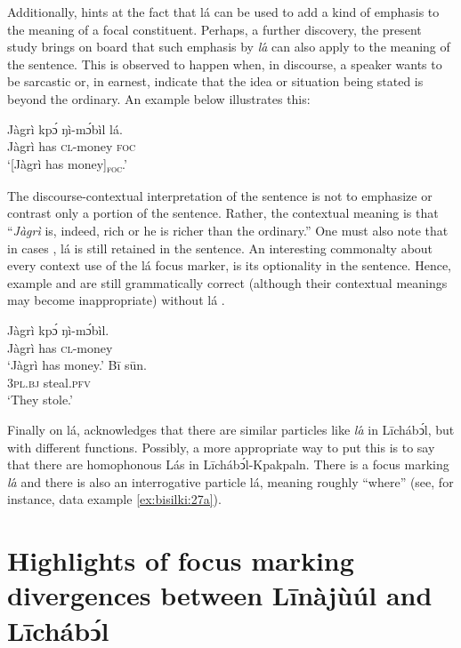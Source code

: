 \documentclass[output=paper,colorlinks,citecolor=brown]{langscibook}
\begin{document}
Additionally, \citet{Schwarz2009} hints at the fact that lá can be used to add a kind of emphasis to the meaning of a focal constituent. Perhaps, a further discovery, the present study brings on board that such emphasis by \textit{la}́ can also apply to the meaning of the sentence. This is observed to happen when, in discourse, a speaker wants to be sarcastic or, in earnest, indicate that the idea or situation being stated is beyond the ordinary. An example  below illustrates this:

\ea%
    \label{ex:bisilki:28}
    \gll    Jàgrì	kpɔ́	ŋì-mɔ́bìl	lá.\\
            Jàgrì	has	\textsc{cl-}money	\textsc{foc}\\
    \glt    ‘[Jàgrì has money]\textsubscript{\textsc{foc}}.’
\z

The discourse-contextual interpretation of the sentence  is not to emphasize or contrast only a portion of the sentence. Rather, the contextual meaning is that “\textit{Jàgrì} is, indeed, rich or he is richer than the ordinary.” One must also note that in cases , lá is still retained in the sentence. An interesting commonalty about every context use of the lá focus marker, is its optionality in the sentence. Hence, example  and  are still grammatically correct (although their contextual meanings may become inappropriate) without lá .

\ea%
    \label{ex:bisilki:29}
    \ea\label{ex:bisilki:29a}
    \gll    Jàgrì	kpɔ́	ŋì-mɔ́bìl.\\
            Jàgrì	has	\textsc{cl-}money\\
    \glt    ‘Jàgrì has money.’
    \ex\label{ex:bisilki:29b}
    \gll    Bī		sūn.\\
            \textsc{3pl.bj}		steal\textsc{.pfv}\\
    \glt    ‘They stole.’
    \z
\z

Finally on lá, \citet{Schwarz2009} acknowledges that there are similar particles like \textit{la}́ in Līchábͻ́l, but with different functions. Possibly, a more appropriate way to put this is to say that there are homophonous Lás in Līchábͻ́l-Kpakpaln. There is a focus marking \textit{la}́ and there is also an interrogative particle lá, meaning roughly “where” (see, for instance, data example \ref{ex:bisilki:27a}).

\section{Highlights of focus marking divergences between Līnàjùúl and Līchábͻ́l
}\label{sec:bisilki:8}
\end{document}
